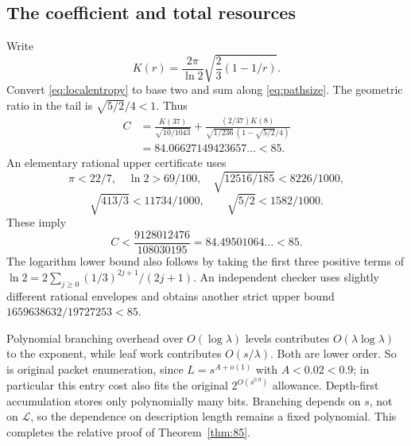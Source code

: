 \subsection{The coefficient and total resources}
Write
\[
 K(r)=\frac{2\pi}{\ln2}\sqrt{\frac23(1-1/r)}.
\]
Convert \eqref{eq:localentropy} to base two and sum along \eqref{eq:pathsize}. The geometric
ratio in the tail is $\sqrt{5/2}/4<1$. Thus
\begin{align}
 C&=\frac{K(37)}{\sqrt{10/1043}}
 +\frac{(2/37)K(8)}{\sqrt{1/236}\,(1-\sqrt{5/2}/4)}\label{eq:C}\\
 &=84.06627149423657\ldots<85.\nonumber
\end{align}
An elementary rational upper certificate uses
\[
 \pi<22/7,\quad \ln2>69/100,\quad
 \sqrt{12516/185}<8226/1000,
\]
\[
 \sqrt{413/3}<11734/1000,\qquad \sqrt{5/2}<1582/1000.
\]
These imply
\[
 C<\frac{9128012476}{108030195}=84.49501064\ldots<85.
\]
The logarithm lower bound also follows by taking the first three positive terms of
$\ln2=2\sum_{j\ge0}(1/3)^{2j+1}/(2j+1)$.
An independent checker uses slightly different rational envelopes and obtains another
strict upper bound $1659638632/19727253<85$.

Polynomial branching overhead over $O(\log\lambda)$ levels contributes
$O(\lambda\log\lambda)$ to the exponent, while leaf work contributes $O(s/\lambda)$.
Both are lower order. So is original packet enumeration, since $L=s^{A+o(1)}$ with
$A<0.02<0.9$; in particular this entry cost also fits the original $2^{O(s^{0.9})}$ allowance. Depth-first accumulation stores only polynomially many bits. Branching depends on
$s$, not on $\mathcal L$, so the dependence on description length remains a fixed polynomial.
This completes the relative proof of Theorem~\ref{thm:85}.

